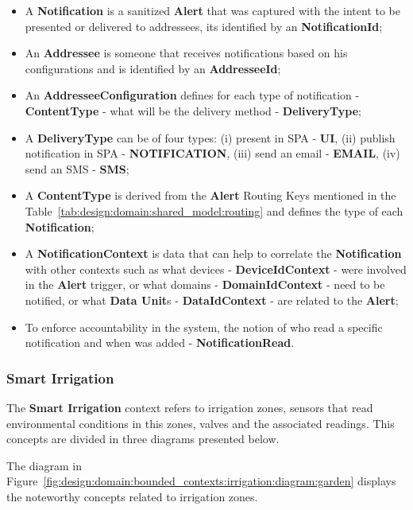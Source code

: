 \begin{itemize}
   \item A \textbf{Notification} is a sanitized \textbf{Alert} that was captured with the intent to be presented or delivered to addressees, its identified by an \textbf{NotificationId};
   \item An \textbf{Addressee} is someone that receives notifications based on his configurations and is identified by an \textbf{AddresseeId};
   \item An \textbf{AddresseeConfiguration} defines for each type of notification - \textbf{ContentType} - what will be the delivery method - \textbf{DeliveryType};
   \item A \textbf{DeliveryType} can be of four types: (i) present in SPA - \textbf{UI}, (ii) publish notification in SPA - \textbf{NOTIFICATION}, (iii) send an email - \textbf{EMAIL}, (iv) send an SMS - \textbf{SMS}; 
   \item A \textbf{ContentType} is derived from the \textbf{Alert} Routing Keys mentioned in the Table~\ref{tab:design:domain:shared_model:routing} and defines the type of each \textbf{Notification};
   \item A \textbf{NotificationContext} is data that can help to correlate the \textbf{Notification} with other contexts such as what devices - \textbf{DeviceIdContext} - were involved in the \textbf{Alert} trigger, or what domains - \textbf{DomainIdContext} - need to be notified, or what \textbf{Data Unit}s - \textbf{DataIdContext} - are related to the \textbf{Alert};
   \item To enforce accountability in the system, the notion of who read a specific notification and when was added - \textbf{NotificationRead}.
\end{itemize}

\subsubsection{Smart Irrigation}
\label{subsubsec:design:domain:bounded_contexts:irrigation}

The \textbf{Smart Irrigation} context refers to irrigation zones, sensors that read environmental conditions in this zones, valves and the associated readings. This concepts are divided in three diagrams presented below.

The diagram in Figure~\ref{fig:design:domain:bounded_contexts:irrigation:diagram:garden} displays the noteworthy concepts related to irrigation zones.

